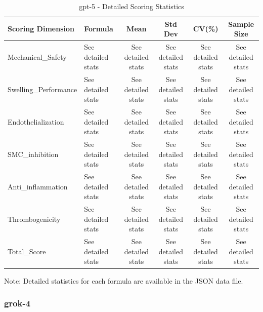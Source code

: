 \documentclass[12pt,a4paper]{article}
\begin{document}
\begin{table}[H]
\centering
\caption{gpt-5 - Detailed Scoring Statistics}
\small
\begin{tabular}{llcccc}
\toprule
\textbf{Scoring Dimension} & \textbf{Formula} & \textbf{Mean} & \textbf{Std Dev} & \textbf{CV(\%)} & \textbf{Sample Size} \\
\midrule
Mechanical\_Safety & See detailed stats & See detailed stats & See detailed stats & See detailed stats & See detailed stats \\
Swelling\_Performance & See detailed stats & See detailed stats & See detailed stats & See detailed stats & See detailed stats \\
Endothelialization & See detailed stats & See detailed stats & See detailed stats & See detailed stats & See detailed stats \\
SMC\_inhibition & See detailed stats & See detailed stats & See detailed stats & See detailed stats & See detailed stats \\
Anti\_inflammation & See detailed stats & See detailed stats & See detailed stats & See detailed stats & See detailed stats \\
Thrombogenicity & See detailed stats & See detailed stats & See detailed stats & See detailed stats & See detailed stats \\
Total\_Score & See detailed stats & See detailed stats & See detailed stats & See detailed stats & See detailed stats \\
\bottomrule
\end{tabular}
\end{table}

Note: Detailed statistics for each formula are available in the JSON data file.

\subsubsection{grok-4}
\end{document}
